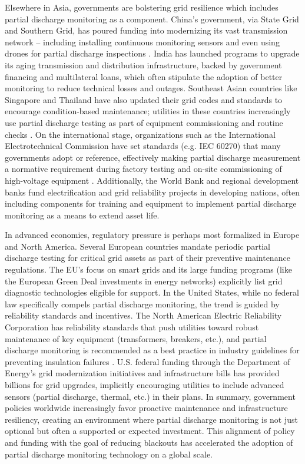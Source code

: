 Elsewhere in Asia, governments are bolstering grid resilience which includes partial discharge monitoring as a component. China's government, via State Grid and Southern Grid, has poured funding into modernizing its vast transmission network – including installing continuous monitoring sensors and even using drones for partial discharge inspections \parencite{Kim_2020}. India has launched programs to upgrade its aging transmission and distribution infrastructure, backed by government financing and multilateral loans, which often stipulate the adoption of better monitoring to reduce technical losses and outages. Southeast Asian countries like Singapore and Thailand have also updated their grid codes and standards to encourage condition-based maintenance; utilities in these countries increasingly use partial discharge testing as part of equipment commissioning and routine checks \parencite{Wang_2024}. On the international stage, organizations such as the International Electrotechnical Commission have set standards (e.g. IEC 60270) that many governments adopt or reference, effectively making partial discharge measurement a normative requirement during factory testing and on-site commissioning of high-voltage equipment \parencite{Vera_2023_1}. Additionally, the World Bank and regional development banks fund electrification and grid reliability projects in developing nations, often including components for training and equipment to implement partial discharge monitoring as a means to extend asset life.

In advanced economies, regulatory pressure is perhaps most formalized in Europe and North America. Several European countries mandate periodic partial discharge testing for critical grid assets as part of their preventive maintenance regulations. The EU's focus on smart grids and its large funding programs (like the European Green Deal investments in energy networks) explicitly list grid diagnostic technologies eligible for support. In the United States, while no federal law specifically compels partial discharge monitoring, the trend is guided by reliability standards and incentives. The North American Electric Reliability Corporation has reliability standards that push utilities toward robust maintenance of key equipment (transformers, breakers, etc.), and partial discharge monitoring is recommended as a best practice in industry guidelines for preventing insulation failures \parencite{Hussain_2021}. U.S. federal funding through the Department of Energy's grid modernization initiatives and infrastructure bills has provided billions for grid upgrades, implicitly encouraging utilities to include advanced sensors (partial discharge, thermal, etc.) in their plans. In summary, government policies worldwide increasingly favor proactive maintenance and infrastructure resiliency, creating an environment where partial discharge monitoring is not just optional but often a supported or expected investment. This alignment of policy and funding with the goal of reducing blackouts has accelerated the adoption of partial discharge monitoring technology on a global scale.

